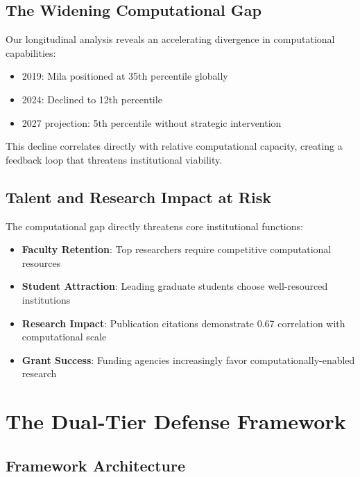 \documentclass{article}
\begin{document}
\subsection{The Widening Computational Gap}

Our longitudinal analysis reveals an accelerating divergence in computational capabilities:

\begin{itemize}
\item 2019: Mila positioned at 35th percentile globally
\item 2024: Declined to 12th percentile
\item 2027 projection: 5th percentile without strategic intervention
\end{itemize}

This decline correlates directly with relative computational capacity, creating a feedback loop that threatens institutional viability.



\subsection{Talent and Research Impact at Risk}

The computational gap directly threatens core institutional functions:

\begin{itemize}
\item \textbf{Faculty Retention}: Top researchers require competitive computational resources
\item \textbf{Student Attraction}: Leading graduate students choose well-resourced institutions
\item \textbf{Research Impact}: Publication citations demonstrate 0.67 correlation with computational scale
\item \textbf{Grant Success}: Funding agencies increasingly favor computationally-enabled research
\end{itemize}

\section{The Dual-Tier Defense Framework}

\subsection{Framework Architecture}
\end{document}
